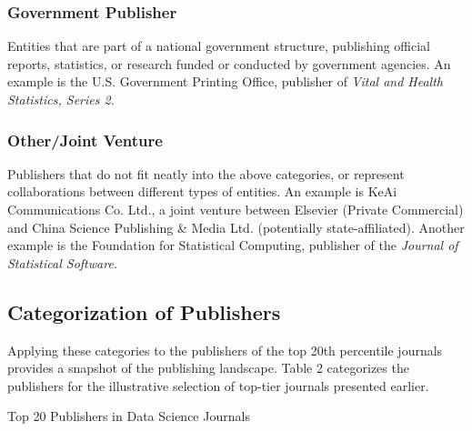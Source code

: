 \documentclass[../main.tex]{subfiles}
\begin{document}
\subsubsection{Government Publisher}
\vspace{0.2cm}
\noindent
Entities that are part of a national government structure, publishing official reports, statistics, or research funded or conducted by government agencies. An example is the U.S. Government Printing Office, publisher of \textit{Vital and Health Statistics, Series 2.}

\subsubsection{Other/Joint Venture}
\vspace{0.2cm}
\noindent
Publishers that do not fit neatly into the above categories, or represent collaborations between different types of entities. An example is KeAi Communications Co. Ltd., a joint venture between Elsevier (Private Commercial) and China Science Publishing \& Media Ltd. (potentially state-affiliated). Another example is the Foundation for Statistical Computing, publisher of the \textit{Journal of Statistical Software.}

\subsection{Categorization of Publishers}

\vspace{0.2cm}
\noindent
Applying these categories to the publishers of the top 20th percentile journals provides a snapshot of the publishing landscape. Table 2 categorizes the publishers for the illustrative selection of top-tier journals presented earlier.

\begin{table}[H]
    \centering
    \scriptsize
    \caption{Top 20 Publishers in Data Science Journals}
    \label{tab:top_20_publishers}
\end{table}
\vspace{0.2cm}
\end{document}
